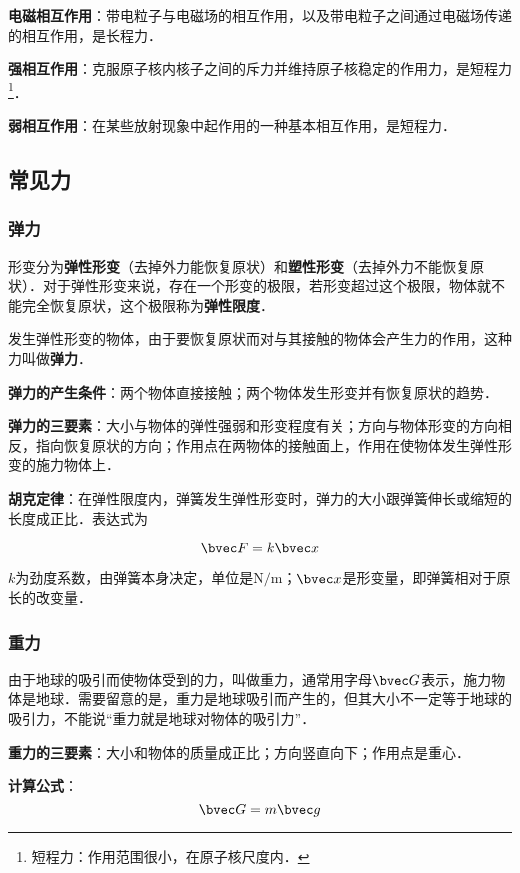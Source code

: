\textbf{电磁相互作用}：带电粒子与电磁场的相互作用，以及带电粒子之间通过电磁场传递的相互作用，是长程力．

\textbf{强相互作用}：克服原子核内核子之间的斥力并维持原子核稳定的作用力，是短程力\footnote{短程力：作用范围很小，在原子核尺度内．}．

\textbf{弱相互作用}：在某些放射现象中起作用的一种基本相互作用，是短程力．

\subsection{常见力}

\subsubsection{弹力}
形变分为\textbf{弹性形变}（去掉外力能恢复原状）和\textbf{塑性形变}（去掉外力不能恢复原状）．对于弹性形变来说，存在一个形变的极限，若形变超过这个极限，物体就不能完全恢复原状，这个极限称为\textbf{弹性限度}．

发生弹性形变的物体，由于要恢复原状而对与其接触的物体会产生力的作用，这种力叫做\textbf{弹力}．

\textbf{弹力的产生条件}：两个物体直接接触；两个物体发生形变并有恢复原状的趋势．

\textbf{弹力的三要素}：大小与物体的弹性强弱和形变程度有关；方向与物体形变的方向相反，指向恢复原状的方向；作用点在两物体的接触面上，作用在使物体发生弹性形变的施力物体上．

\textbf{胡克定律}：在弹性限度内，弹簧发生弹性形变时，弹力的大小跟弹簧伸长或缩短的长度成正比．表达式为

\begin{equation}
\bvec F=k\bvec x
\end{equation}

$k$为劲度系数，由弹簧本身决定，单位是$\mathrm{N/m}$；$\bvec x$是形变量，即弹簧相对于原长的改变量．

\subsubsection{重力}
由于地球的吸引而使物体受到的力，叫做重力，通常用字母$\bvec G$表示，施力物体是地球．需要留意的是，重力是地球吸引而产生的，但其大小不一定等于地球的吸引力，不能说“重力就是地球对物体的吸引力”．

\textbf{重力的三要素}：大小和物体的质量成正比；方向竖直向下；作用点是重心．

\textbf{计算公式}：
\begin{equation}
\bvec G=m\bvec g
\end{equation}

